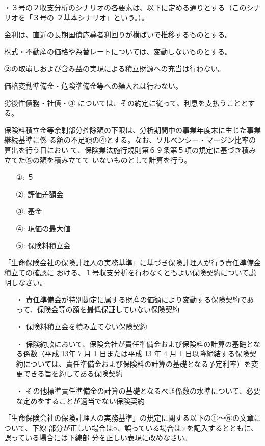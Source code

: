 \documentclass[report,gutter=10mm,fore-edge=10mm,uplatex,dvipdfmx]{jlreq}
\begin{document}
・３号の２収支分析のシナリオの各要素は、以下に定める通りとする（このシナリオを「３号の
２基本シナリオ」という。）。

 金利は、直近の長期国債応募者利回りが横ばいで推移するものとする。

 株式・不動産の価格や為替レートについては、変動しないものとする。

②の取崩しおよび含み益の実現による積立財源への充当は行わない。

 価格変動準備金・危険準備金等への繰入れは行わない。

 劣後性債務・社債・③
については、その約定に従って、利息を支払うこととする。

保険料積立金等余剰部分控除額の下限は、分析期間中の事業年度末に生じた事業継続基準に係
る額の不足額の④とする。なお、ソルベンシー・マージン比率の算出を行う日におい
て、保険業法施行規則第６９条第５項の規定に基づき積み立てた⑤の額を積み立てて
いないものとして計算を行う。

\answer{}
\begin{itemize}
 \item[①: ]  ５ 
 \item[②: ]  評価差額金 
 \item[③: ]  基金 
 \item[④: ]  現価の最大値 
 \item[⑤: ]  保険料積立金 
\end{itemize}

「生命保険会社の保険計理人の実務基準」に基づき保険計理人が行う責任準備金積立ての確認に
おける、１号収支分析を行わなくともよい保険契約について説明しなさい。
\answer{}
\begin{itemize}
\item[ ・] 責任準備金が特別勘定に属する財産の価額により変動する保険契約であって、保険金等の額を最低保証していない保険契約
\item[ ・] 保険料積立金を積み立てない保険契約
\item[ ・] 保険約款において、保険会社が責任準備金および保険料の計算の基礎となる係数（平成 13年 7 月 1 日または平成 13 年 4 月 1 日以降締結する保険契約については、責任準備金および保険料の計算の基礎となる予定利率）を変更できる旨を約してある保険契約
\item[ ・] その他標準責任準備金の計算の基礎となるべき係数の水準について、必要な定めをすることが適当でない保険契約
\end{itemize}

「生命保険会社の保険計理人の実務基準」の規定に関する以下の①～⑥の文章について、下線
部分が正しい場合は○、誤っている場合は×を記入するとともに、誤っている場合には下線部
分を正しい表現に改めなさい。
\end{document}
